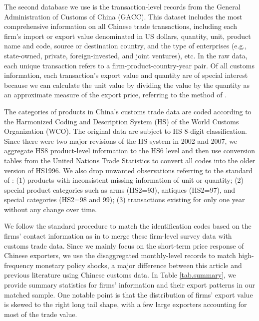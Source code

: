 The second database we use is the transaction-level records from the General Administration of Customs of China (GACC). This dataset includes the most comprehensive information on all Chinese trade transactions, including each firm's import or export value denominated in US dollars, quantity, unit, product name and code, source or destination country, and the type of enterprises (e.g., state-owned, private, foreign-invested, and joint ventures), etc. In the raw data, each unique transaction refers to a firm-product-country-year pair. Of all customs information, each transaction's export value and quantity are of special interest because we can calculate the unit value by dividing the value by the quantity as an approximate measure of the export price, referring to the method of \cite{deloecker2012markups}. 

The categories of products in China's customs trade data are coded according to the Harmonized Coding and Description System (HS) of the World Customs Organization (WCO). The original data are subject to HS 8-digit classification. Since there were two major revisions of the HS system in 2002 and 2007, we aggregate HS8 product-level information to the HS6 level and then use conversion tables from the United Nations Trade Statistics to convert all codes into the older version of HS1996. We also drop unwanted observations referring to the standard of \cite{li2015exchange}: (1) products with inconsistent missing information of unit or quantity; (2) special product categories such as arms (HS2=93), antiques (HS2=97), and special categories (HS2=98 and 99); (3) transactions existing for only one year without any change over time.

We follow the standard procedure to match the identification codes based on the firms' contact information as in \cite{feenstra2014exports} to merge these firm-level survey data with customs trade data. Since we mainly focus on the short-term price response of Chinese exporters, we use the disaggregated monthly-level records to match high-frequency monetary policy shocks, a major difference between this article and previous literature using Chinese customs data. In Table \ref{tab.summary}, we provide summary statistics for firms' information and their export patterns in our matched sample. One notable point is that the distribution of firms' export value is skewed to the right long tail shape, with a few large exporters accounting for most of the trade value.

